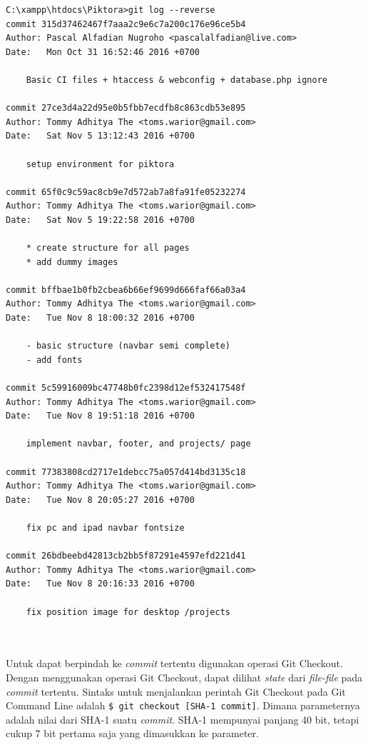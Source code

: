 \begin{lstlisting}[caption={Sebagian histori \textit{commit} pada proyek Piktora, ditampilkan dengan urutan \textit{commit} terlama},label={lst:commit_history_piktora_reverse},language=plaintext]
C:\xampp\htdocs\Piktora>git log --reverse
commit 315d37462467f7aaa2c9e6c7a200c176e96ce5b4
Author: Pascal Alfadian Nugroho <pascalalfadian@live.com>
Date:   Mon Oct 31 16:52:46 2016 +0700

    Basic CI files + htaccess & webconfig + database.php ignore

commit 27ce3d4a22d95e0b5fbb7ecdfb8c863cdb53e895
Author: Tommy Adhitya The <toms.warior@gmail.com>
Date:   Sat Nov 5 13:12:43 2016 +0700

    setup environment for piktora

commit 65f0c9c59ac8cb9e7d572ab7a8fa91fe05232274
Author: Tommy Adhitya The <toms.warior@gmail.com>
Date:   Sat Nov 5 19:22:58 2016 +0700

    * create structure for all pages
    * add dummy images

commit bffbae1b0fb2cbea6b66ef9699d666faf66a03a4
Author: Tommy Adhitya The <toms.warior@gmail.com>
Date:   Tue Nov 8 18:00:32 2016 +0700

    - basic structure (navbar semi complete)
    - add fonts

commit 5c59916009bc47748b0fc2398d12ef532417548f
Author: Tommy Adhitya The <toms.warior@gmail.com>
Date:   Tue Nov 8 19:51:18 2016 +0700

    implement navbar, footer, and projects/ page

commit 77383808cd2717e1debcc75a057d414bd3135c18
Author: Tommy Adhitya The <toms.warior@gmail.com>
Date:   Tue Nov 8 20:05:27 2016 +0700

    fix pc and ipad navbar fontsize

commit 26bdbeebd42813cb2bb5f87291e4597efd221d41
Author: Tommy Adhitya The <toms.warior@gmail.com>
Date:   Tue Nov 8 20:16:33 2016 +0700

    fix position image for desktop /projects
    
\end{lstlisting}
\ \\
Untuk dapat berpindah ke \textit{commit} tertentu digunakan operasi Git Checkout. Dengan menggunakan operasi Git Checkout, dapat dilihat \textit{state} dari \textit{file-file} pada \textit{commit} tertentu. Sintaks untuk menjalankan perintah Git Checkout pada Git Command Line adalah \texttt{\$ git checkout [SHA-1 commit]}. Dimana parameternya adalah nilai dari SHA-1 suatu \textit{commit}. SHA-1 mempunyai panjang 40 bit, tetapi cukup 7 bit pertama saja yang dimasukkan ke parameter.

